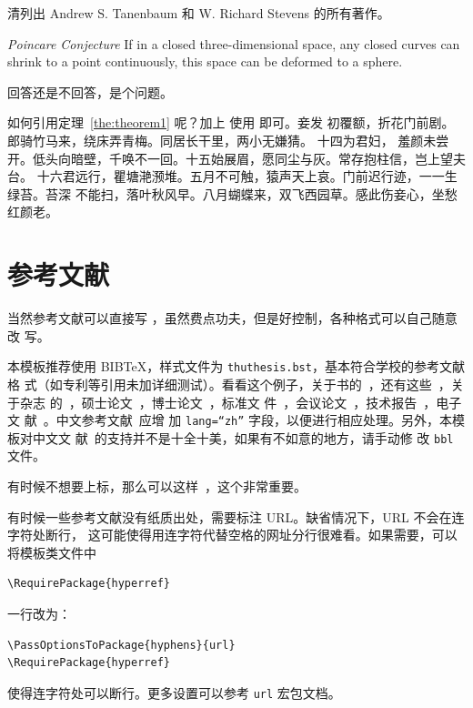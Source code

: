 \begin{exercise}
  清列出 Andrew S. Tanenbaum 和 W. Richard Stevens 的所有著作。
\end{exercise}

\begin{conjecture} \textit{Poincare Conjecture} If in a closed three-dimensional
  space, any closed curves can shrink to a point continuously, this space can be
  deformed to a sphere.
\end{conjecture}

\begin{problem}
 回答还是不回答，是个问题。 
\end{problem}

如何引用定理~\ref{the:theorem1} 呢？加上  使用  即可。妾发
初覆额，折花门前剧。郎骑竹马来，绕床弄青梅。同居长干里，两小无嫌猜。 十四为君妇，
羞颜未尝开。低头向暗壁，千唤不一回。十五始展眉，愿同尘与灰。常存抱柱信，岂上望夫
台。 十六君远行，瞿塘滟滪堆。五月不可触，猿声天上哀。门前迟行迹，一一生绿苔。苔深
不能扫，落叶秋风早。八月蝴蝶来，双飞西园草。感此伤妾心，坐愁红颜老。

\section{参考文献}
\label{sec:bib}
当然参考文献可以直接写 ，虽然费点功夫，但是好控制，各种格式可以自己随意改
写。

本模板推荐使用 BIB\TeX，样式文件为 \texttt{thuthesis.bst}，基本符合学校的参考文献格
式（如专利等引用未加详细测试）。看看这个例子，关于书的~\cite{tex, companion,
  ColdSources}，还有这些~\cite{Krasnogor2004e, clzs, zjsw}，关于杂志
的~\cite{ELIDRISSI94, MELLINGER96, SHELL02}，硕士论文~\cite{zhubajie,
  metamori2004}，博士论文~\cite{shaheshang, FistSystem01}，标准文
件~\cite{IEEE-1363}，会议论文~\cite{DPMG,kocher99}，技术报告~\cite{NPB2}，电子文
献~\cite{chuban2001,oclc2000}。中文参考文献~\cite{cnarticle}应增
加 \texttt{lang=``zh''} 字段，以便进行相应处理。另外，本模板对中文文
献~\cite{cnproceed}的支持并不是十全十美，如果有不如意的地方，请手动修
改 \texttt{bbl} 文件。

有时候不想要上标，那么可以这样~，这个非常重要。

有时候一些参考文献没有纸质出处，需要标注 URL。缺省情况下，URL 不会在连字符处断行，
这可能使得用连字符代替空格的网址分行很难看。如果需要，可以将模板类文件中
\begin{verbatim}
\RequirePackage{hyperref}
\end{verbatim}
一行改为：
\begin{verbatim}
\PassOptionsToPackage{hyphens}{url}
\RequirePackage{hyperref}
\end{verbatim}
使得连字符处可以断行。更多设置可以参考 \texttt{url} 宏包文档。

